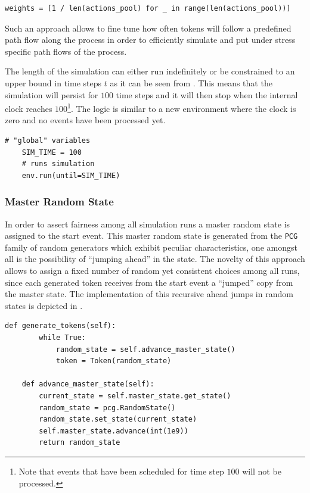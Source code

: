 \begin{lstlisting}[caption=Probability weights vector for each path flow,label=lst:probabilities_path_flow,style=CustomPython]
    weights = [1 / len(actions_pool) for _ in range(len(actions_pool))]
\end{lstlisting}

Such an approach allows to fine tune how often tokens will follow a predefined path flow along the process in order to efficiently simulate and put under stress specific path flows of the process.

The length of the simulation can either run indefinitely or be constrained to an upper bound in time steps $t$ as it can be seen from . This means that the simulation will persist for $100$ time steps and it will then stop when the internal clock reaches $100$\footnote{Note that events that have been scheduled for time step $100$ will not be processed.}. The logic is similar to a new environment where the clock is zero and no events have been processed yet.

\begin{lstlisting}[caption=Starting the simulation with discrete time steps,label=lst:simulation_steps,style=CustomPython]
    # "global" variables
    SIM_TIME = 100
    # runs simulation
    env.run(until=SIM_TIME)
\end{lstlisting}

\subsubsection{Master Random State}

In order to assert fairness among all simulation runs a master random state is assigned to the start event. This master random state is generated from the \texttt{PCG} family of random generators which exhibit peculiar characteristics, one amongst all is the possibility of ``jumping ahead'' in the state. The novelty of this approach allows to assign a fixed number of random yet consistent choices among all runs, since each generated token receives from the start event a ``jumped'' copy from the master state. The implementation of this recursive ahead jumps in random states is depicted in .

\begin{lstlisting}[caption=Master random state jump ahead,label=lst:random_state_jump,style=CustomPython]
    def generate_tokens(self):
        while True:
            random_state = self.advance_master_state()
            token = Token(random_state)

    def advance_master_state(self):
        current_state = self.master_state.get_state()
        random_state = pcg.RandomState()
        random_state.set_state(current_state)
        self.master_state.advance(int(1e9))
        return random_state
\end{lstlisting}


